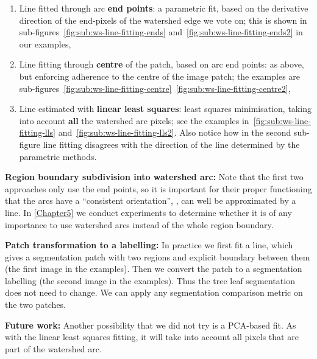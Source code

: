 \begin{enumerate}
  \item{Line fitted through arc {\bf end points}:} a parametric fit, based on the derivative direction of the end-pixels of the watershed edge we vote on; this is shown in sub-figures~\ref{fig:sub:ws-line-fitting-ends} and~\ref{fig:sub:ws-line-fitting-ends2} in our examples,
  \item{Line fitting through {\bf centre} of the patch, based on arc end points:} as above, but enforcing adherence to the centre of the image patch; the examples are sub-figures~\ref{fig:sub:ws-line-fitting-centre}~\ref{fig:sub:ws-line-fitting-centre2},
  \item{Line estimated with {\bf linear least squares}:} least squares minimisation, taking into account \textbf{all} the watershed arc pixels; see the examples in~\ref{fig:sub:ws-line-fitting-lls} and~\ref{fig:sub:ws-line-fitting-lls2}. Also notice how in the second sub-figure line fitting disagrees with the direction of the line determined by the parametric methods.
\end{enumerate}

\textbf{Region boundary subdivision into watershed arc:} Note that the first two approaches only use the end points, so it is important for their proper functioning that the arcs have a ``consistent orientation'', \ie, can well be approximated by a line. In \cref{Chapter5} we conduct experiments to determine whether it is of any importance to use watershed arcs instead of the whole region boundary.

\textbf{Patch transformation to a labelling:} In practice we first fit a line, which gives a segmentation patch with two regions and explicit boundary between them (the first image in the examples). Then we convert the patch to a segmentation labelling (the second image in the examples). Thus the tree leaf segmentation does not need to change. We can apply any segmentation comparison metric on the two patches.

\textbf{Future work:} Another possibility that we did not try is a PCA-based fit. As with the linear least squares fitting, it will take into account all pixels that are part of the watershed arc.

